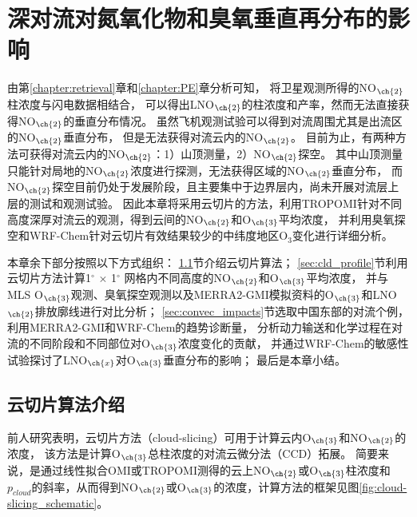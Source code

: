 
\chapter{深对流对氮氧化物和臭氧垂直再分布的影响}

由第\ref{chapter:retrieval}章和\ref{chapter:PE}章分析可知，
将卫星观测所得的NO$_{\ch{2}}$柱浓度与闪电数据相结合，
可以得出LNO$_{\ch{2}}$的柱浓度和产率，然而无法直接获得NO$_{\ch{2}}$的垂直分布情况。
虽然飞机观测试验可以得到对流周围尤其是出流区的NO$_{\ch{2}}$垂直分布\citep{Barth.2019}，
但是无法获得对流云内的NO$_{\ch{2}}$。
目前为止，有两种方法可获得对流云内的NO$_{\ch{2}}$：1）山顶测量，2）NO$_{\ch{2}}$探空。
其中山顶测量只能针对局地的NO$_{\ch{2}}$浓度进行探测，无法获得区域的NO$_{\ch{2}}$垂直分布\citep{Reiter.1970,Wang.2021a}，
而NO$_{\ch{2}}$探空目前仍处于发展阶段，且主要集中于边界层内\citep{Sluis.2010}，尚未开展对流层上层的测试和观测试验。
因此本章将采用云切片的方法，利用TROPOMI针对不同高度深厚对流云的观测，得到云间的NO$_{\ch{2}}$和O$_{\ch{3}}$平均浓度，
并利用臭氧探空和WRF-Chem针对云切片有效结果较少的中纬度地区O$_3$变化进行详细分析。

本章余下部分按照以下方式组织：
\ref{sec:cloud-slicing}节介绍云切片算法；
\ref{sec:cld_profile}节利用云切片方法计算1$^{\circ}$ $\times$ 1$^{\circ}$ 网格内不同高度的NO$_{\ch{2}}$和O$_{\ch{3}}$平均浓度，
并与MLS O$_{\ch{3}}$观测、臭氧探空观测以及MERRA2-GMI模拟资料的O$_{\ch{3}}$和LNO$_{\ch{2}}$排放廓线进行对比分析；
\ref{sec:convec_impacts}节选取中国东部的对流个例，利用MERRA2-GMI和WRF-Chem的趋势诊断量，
分析动力输送和化学过程在对流的不同阶段和不同部位对O$_{\ch{3}}$浓度变化的贡献，
并通过WRF-Chem的敏感性试验探讨了LNO$_{\ch{x}}$对O$_{\ch{3}}$垂直分布的影响；
最后是本章小结。


\section{云切片算法介绍} \label{sec:cloud-slicing}

前人研究表明，云切片方法（cloud-slicing）可用于计算云内O$_{\ch{3}}$和NO$_{\ch{2}}$的浓度，
该方法是计算O$_{\ch{3}}$总柱浓度的对流云微分法（CCD）拓展\citep{Ziemke.1998,Ziemke.2001}。
简要来说，是通过线性拟合OMI或TROPOMI测得的云上NO$_{\ch{2}}$或O$_{\ch{3}}$柱浓度和$p_{cloud}$的斜率，从而得到NO$_{\ch{2}}$或O$_{\ch{3}}$的浓度，计算方法的框架见图\ref{fig:cloud-slicing_schematic}。

